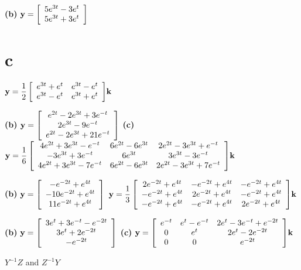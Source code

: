 \medskip

{\bf (b)} ${\bf
y}=\displaystyle{\left[\begin{array}{c}5e^{3t}-3e^{t}\\5e^{3t}+3e^{t}
\end{array}\right]}$  \qquad\; \;
\part{c}
$\displaystyle{\bf y}={\frac{1}{2}\left[\begin{array}{cc}e^{3t}+e^{t}&e^{3t}-e^{t}
\\e^{3t}-e^{t}&e^{3t}+e^{t}\end{array}\right]}{\bf k}$

\medskip

{\bf (b)}
${\bf y
}=\displaystyle{\left[\begin{array}{c}e^{2t}-2e^{3t}+3e^{-t}\\2e^{3t}-9e^{-t}\\
e^{2t}-2e^{3t}+21e^{-t}\end{array}\right]}$
 \hspace*{10pt} {\bf (c)}
${\bf y}=
\displaystyle{\frac{1}{6}\left[\begin{array}{ccc}4e^{2t}+3e^{3t}-e^{-t}&6e^{2t}-6e^{3t}
&2e^{2t}-3e^{3t}+e^{-t}
\\-3e^{3t}+3e^{-t}&6e^{3t}&3e^{3t}-3e^{-t}\\
4e^{2t}+3e^{3t}-7e^{-t}&6e^{2t}-6e^{3t}&2e^{2t}-3e^{3t}+7e^{-t}
\end{array}\right]}{\bf k}$

\medskip

{\bf (b)}
${\bf y
}=\displaystyle{\left[\begin{array}{c}-e^{-2t}+e^{4t}\\-10e^{-2t}+e^{4t}\\
11e^{-2t}+e^{4t}\end{array}\right]}$
 \hspace*{10pt}
${\bf y}=
\displaystyle{\frac{1}{3}\left[\begin{array}{ccc}2e^{-2t}+e^{4t}&-e^{-2t}+e^{4t}
&-e^{-2t}+e^{4t}
\\-e^{-2t}+e^{4t}&2e^{-2t}+e^{4t}&-e^{-2t}+e^{4t}\\
-e^{-2t}+e^{4t}&-e^{-2t}+e^{4t}&2e^{-2t}+e^{4t}
\end{array}\right]}{\bf k}$

\medskip

{\bf (b)}
${\bf y
}=\displaystyle{\left[\begin{array}{c}3e^{t}+3e^{-t}-e^{-2t}\\3e^{t}+2e^{-2t}\\
-e^{-2t}\end{array}\right]}$
\hspace*{10pt}\;   {\bf (c)}
${\bf y}=\displaystyle{\left[\begin{array}{ccc}e^{-t}&e^{t}-e^{-t}
&2e^{t}-3e^{-t}+e^{-2t}\\0&e^{t}&2e^{t}-2e^{-2t}\\
0&0&e^{-2t}\end{array}\right]}{\bf k}$

$Y^{-1}Z$ and $Z^{-1}Y$

